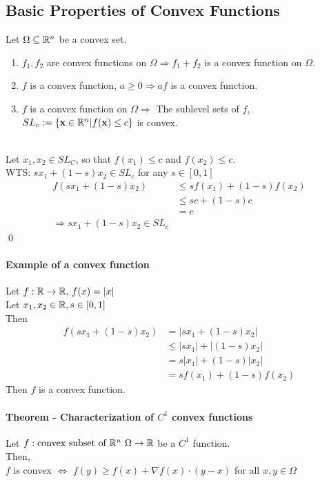 \documentclass[11pt]{article}
\begin{document}
\subsection{Basic Properties of Convex Functions}
Let $\Omega \subseteq \mathbb{R}^n$ be a convex set.
\begin{enumerate}
	\item $f_1, f_2$ are convex functions on $\Omega \Rightarrow f_1 + f_2$ is a convex function on $\Omega$.
	\item $f$ is a convex function, $a \geq 0 \Rightarrow af$ is a convex function.
	\item $f$ is a convex function on $\Omega \Rightarrow$ The sublevel sets of $f$, $SL_c:=\{\textbf{x} \in \mathbb{R}^n | f(\textbf{x}) \leq c\}$ is convex.
\end{enumerate}
 \\
Let $x_1, x_2 \in SL_C$, so that $f(x_1) \leq c$ and $f(x_2) \leq c$. \\
WTS: $sx_1 + (1-s)x_2 \in SL_c$ for any $s \in [0,1]$
\begin{align*}
	f(sx_1 + (1-s)x_2) &\leq sf(x_1) + (1-s)f(x_2) \tag{$f$ is convex}\\
	&\leq sc + (1-s)c \\
	&= c \\
\Rightarrow sx_1 + (1-s)x_2 \in SL_c
\end{align*}
\qed

\paragraph{Example of a convex function}
Let $f: \mathbb{R} \rightarrow \mathbb{R}, \,f(x) = |x|$ \\
Let $x_1, x_2 \in \mathbb{R}, s \in [0,1]$ \\
Then
\begin{align*}
	f(sx_1 + (1-s)x_2) &= |sx_1 + (1-s)x_2| \\
	&\leq |sx_1| + |(1-s)x_2| \tag{by Triangle Inequality}\\
	&= s|x_1| + (1-s)|x_2| \\
	&= sf(x_1) + (1-s)f(x_2)
\end{align*}
Then $f$ is a convex function.
\paragraph{Theorem - Characterization of $C^1$ convex functions}
Let $f: \text{convex subset of $\mathbb{R}^n$ } \Omega \rightarrow \mathbb{R}$ be a $C^1$ function. \\
Then,\\
$f$ is convex $\iff$ $f(y) \geq f(x) + \nabla f(x)\cdot(y-x)$ 
for all $x,y \in \Omega$
\end{document}
